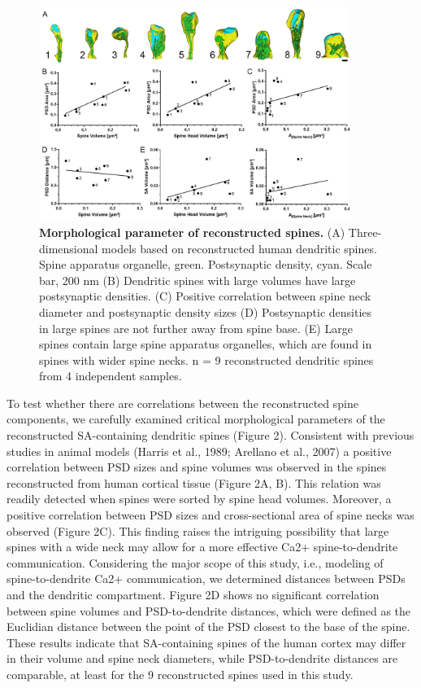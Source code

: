 \documentclass[fleqn,10pt]{wlscirep}
\begin{document}
\begin{figure}[h!]
\centering
\includegraphics[width=0.9\textwidth]{images/figure2.png}
\caption{{\small\textbf{ Morphological parameter of reconstructed spines.} (A) Three-dimensional models based on reconstructed human dendritic spines. Spine apparatus organelle, green. Postsynaptic density, cyan. Scale bar, 200 nm (B) Dendritic spines with large volumes have large postsynaptic densities. (C) Positive correlation between spine neck diameter and postsynaptic density sizes (D) Postsynaptic densities in large spines are not further away from spine base. (E) Large spines contain large spine apparatus organelles, which are found in spines with wider spine necks. n = 9 reconstructed dendritic spines from 4 independent samples.}}
\end{figure}

To test whether there are correlations between the reconstructed spine components, we carefully examined critical morphological parameters of the reconstructed SA-containing dendritic spines (Figure 2). Consistent with previous studies in animal models (Harris et al., 1989; Arellano et al., 2007) a positive correlation between PSD sizes and spine volumes was observed in the spines reconstructed from human cortical tissue (Figure 2A, B). This relation was readily detected when spines were sorted by spine head volumes. Moreover, a positive correlation between PSD sizes and cross-sectional area of spine necks was observed (Figure 2C). This finding raises the intriguing possibility that large spines with a wide neck may allow for a more effective Ca2+ spine-to-dendrite communication.
Considering the major scope of this study, i.e., modeling of spine-to-dendrite Ca2+ communication, we determined distances between PSDs and the dendritic compartment. Figure 2D shows no significant correlation between spine volumes and PSD-to-dendrite distances, which were defined as the Euclidian distance between the point of the PSD closest to the base of the spine. These results indicate that SA-containing spines of the human cortex may differ in their volume and spine neck diameters, while PSD-to-dendrite distances are comparable, at least for the 9 reconstructed spines used in this study.
\end{document}
